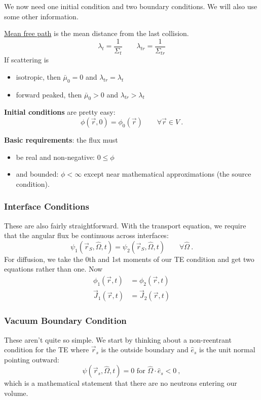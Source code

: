 \documentclass[12pt]{article}
\newcommand{\vOmega}{\ensuremath{\hat{\Omega}}}
\begin{document}
We now need one initial condition and two boundary conditions. We will also use some other information.

\underline{Mean free path} is the mean distance from the last collision.
\[\lambda_{t} = \frac{1}{\Sigma_t} \qquad \lambda_{tr} = \frac{1}{\Sigma_{tr}}\]
%
If scattering is 
\begin{itemize}
\item isotropic, then $\bar{\mu}_0 = 0$ and $\lambda_{tr} = \lambda_{t}$
\item forward peaked, then $\bar{\mu}_0 > 0$ and $\lambda_{tr} > \lambda_{t}$
\end{itemize}	

\textbf{Initial conditions} are pretty easy:
\[\phi(\vec{r}, 0) = \phi_0(\vec{r}) \qquad \forall \vec{r} \in V \:.\]

\textbf{Basic requirements}: the flux must
\begin{itemize}
\item be real and non-negative: $0 \leq \phi$
\item and bounded: $\phi < \infty$ except near mathematical approximations (the source condition). 
\end{itemize}

\subsubsection*{Interface Conditions}
These are also fairly straightforward. With the transport equation, we require that the angular flux be continuous across interfaces: 
\[\psi_1(\vec{r}_S, \vOmega, t) = \psi_2(\vec{r}_S,\vOmega, t)\qquad \forall \vOmega\:.\]
For diffusion, we take the 0th and 1st moments of our TE condition and get two equations rather than one. Now
\begin{align*}
\phi_1(\vec{r}, t) &= \phi_2(\vec{r}, t) \\
\vec{J}_1(\vec{r}, t) &= \vec{J}_2(\vec{r}, t)
\end{align*}

\subsubsection*{Vacuum Boundary Condition}
These aren't quite so simple. We start by thinking about a non-reentrant condition for the TE where $\vec{r}_s$ is the outside boundary and $\hat{e}_s$ is the unit normal pointing outward: 
\[\psi(\vec{r}_s, \vOmega, t) = 0 \text{ for } \vOmega \cdot \hat{e}_s < 0 \:,\]
%
which is a mathematical statement that there are no neutrons entering our volume. 
\end{document}
